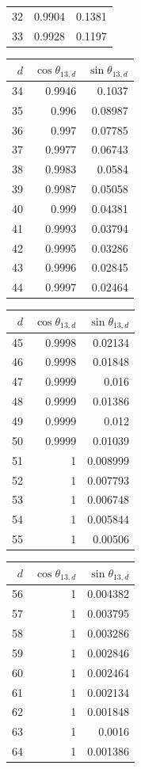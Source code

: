 {\begin{tabular}[t]{r|rr}
32 & 0.9904 & 0.1381 \\
33 & 0.9928 & 0.1197
\end{tabular}\kern4pt
\begin{tabular}[t]{r|rr}
$d$ & $\cos\theta_{13,d}$ & $\sin\theta_{13,d}$ \\\hline
34 & 0.9946 & 0.1037 \\
35 & 0.996 & 0.08987 \\
36 & 0.997 & 0.07785 \\
37 & 0.9977 & 0.06743 \\
38 & 0.9983 & 0.0584 \\
39 & 0.9987 & 0.05058 \\
40 & 0.999 & 0.04381 \\
41 & 0.9993 & 0.03794 \\
42 & 0.9995 & 0.03286 \\
43 & 0.9996 & 0.02845 \\
44 & 0.9997 & 0.02464
\end{tabular}\kern4pt
\begin{tabular}[t]{r|rr}
$d$ & $\cos\theta_{13,d}$ & $\sin\theta_{13,d}$ \\\hline
45 & 0.9998 & 0.02134 \\
46 & 0.9998 & 0.01848 \\
47 & 0.9999 & 0.016 \\
48 & 0.9999 & 0.01386 \\
49 & 0.9999 & 0.012 \\
50 & 0.9999 & 0.01039 \\
51 & 1 & 0.008999 \\
52 & 1 & 0.007793 \\
53 & 1 & 0.006748 \\
54 & 1 & 0.005844 \\
55 & 1 & 0.00506
\end{tabular}\kern4pt
\begin{tabular}[t]{r|rr}
$d$ & $\cos\theta_{13,d}$ & $\sin\theta_{13,d}$ \\\hline
56 & 1 & 0.004382 \\
57 & 1 & 0.003795 \\
58 & 1 & 0.003286 \\
59 & 1 & 0.002846 \\
60 & 1 & 0.002464 \\
61 & 1 & 0.002134 \\
62 & 1 & 0.001848 \\
63 & 1 & 0.0016 \\
64 & 1 & 0.001386
\end{tabular}}

